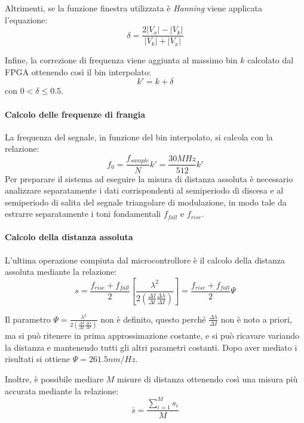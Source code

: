 Altrimenti, se la funzione finestra utilizzata è \textit{Hanning} viene applicata l'equazione:
\begin{equation}
	\delta = \frac{2|V_{x}|-|V_{k}|}{|V_{k}|+|V_{x}|}
\end{equation}

Infine, la correzione di frequenza  viene aggiunta al massimo bin $k$ calcolato dal FPGA ottenendo così il bin interpolato:
\begin{equation}
	k'=k+\delta
\end{equation}
con $ 0 < \delta \leq 0.5 $.

\paragraph{Calcolo delle frequenze di frangia}
La frequenza del segnale, in funzione del bin interpolato, si calcola con la relazione:
\begin{equation}
	f_0 = \frac{f_{sample}}{N} k' = \frac{30MHz}{512} k'
\end{equation}
Per preparare il sistema ad eseguire la misura di distanza assoluta è necessario analizzare separatamente i dati corrispondenti al semiperiodo di discesa e al semiperiodo di salita del segnale triangolare di modulazione, in modo tale da estrarre separatamente i toni fondamentali $f_{fall}$ e $f_{rise}$.

\paragraph{Calcolo della distanza assoluta}
L'ultima operazione compiuta dal microcontrollore è il calcolo della distanza assoluta mediante la relazione:
\begin{equation}
	s = \frac{f_{rise}+f_{fall}}{2} \left [ \frac{\lambda^2}{2\left ( \frac{\Delta I}{\Delta t} \frac{\Delta \lambda}{\Delta I} \right )}  \right ] = \frac{f_{rise}+f_{fall}}{2} \Psi
\end{equation}

Il parametro $\Psi = \frac{\lambda^2}{2\left ( \frac{\Delta I}{\Delta t} \frac{\Delta \lambda}{\Delta I} \right )} $ non è definito, questo perché $\frac{\Delta \lambda}{\Delta I}$ non è noto a priori, ma si può ritenere in prima approssimazione costante, e si può ricavare variando la distanza e mantenendo tutti gli altri parametri costanti. Dopo aver mediato i risultati si ottiene $\Psi=261.5 nm/Hz$.

Inoltre, è possibile mediare $M$ misure di distanza ottenendo così una misura più accurata mediante la relazione:
\begin{equation}
	\bar{s} = \frac{\sum_{i=1}^{M} s_i}{M}
\end{equation}

